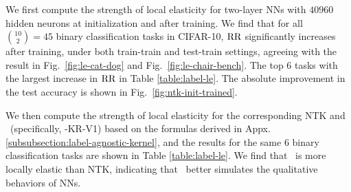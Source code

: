 We first compute the strength of local elasticity for two-layer NNs with $40960$ hidden neurons at initialization and after training. We find that for all $\binom{10}{2} = 45$ binary classification tasks in CIFAR-10, $\textnormal{RR}$ significantly increases after training, under both train-train and test-train settings, agreeing with the result in Fig.~\ref{fig:le-cat-dog} and Fig.~\ref{fig:le-chair-bench}. The top $6$ tasks with the largest increase in $\textnormal{RR}$ in Table \ref{table:label-le}. The absolute improvement in the test accuracy is shown in Fig.~\ref{fig:ntk-init-trained}.

We then compute the strength of local elasticity for the corresponding NTK and \lantk~(specifically, \lantk-KR-V1) based on the formulas derived in Appx. \ref{subsubsection:label-agnostic-kernel},
and the results for the same $6$ binary classification tasks are shown in Table \ref{table:label-le}. We find that \lantk~is more locally elastic than NTK, indicating that \lantk~better simulates the qualitative behaviors of NNs. 






